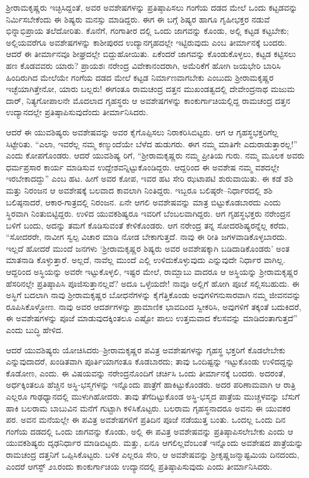 ಶ್ರೀರಾಮಕೃಷ್ಣರು ಇಚ್ಛಿಸಿದ್ದಂತೆ, ಅವರ ಅವಶೇಷಗಳನ್ನು ಪ್ರತಿಷ್ಠಾಪಿಸಲು ಗಂಗೆಯ ದಡದ ಮೇಲೆ ಒಂದು ಕಟ್ಟಡವನ್ನು ನಿರ್ಮಿಸಬೇಕೆಂದು ಈ ಶಿಷ್ಯರು ಮನಸ್ಸು ಮಾಡಿದ್ದರು. ಈಗ ಈ ಬಗ್ಗೆ ಶಿಷ್ಯರ ಹಾಗೂ ಗೃಹೀಭಕ್ತರ ನಡುವೆ ಭಿನ್ನಾಭಿಪ್ರಾಯ ತಲೆದೋರಿತು. ಕೊನೆಗೆ, ಗಂಗಾತೀರ ದಲ್ಲಿ ಒಂದು ಜಾಗವನ್ನು ಕೊಂಡು, ಅಲ್ಲಿ ಕಟ್ಟಡ ಕಟ್ಟಬೇಕು; ಅಲ್ಲಿಯವರೆಗೂ ಅವಶೇಷಗಳನ್ನು ಕಾಶೀಪುರದ ಉದ್ಯಾನಗೃಹದಲ್ಲೇ ಇಟ್ಟಿರುವುದು ಎಂಬ ತೀರ್ಮಾನಕ್ಕೆ ಬಂದರು. ಆದರೆ ಈ ತೀರ್ಮಾನವೂ ಶೀಘ್ರದಲ್ಲೇ ಬಿದ್ದುಹೋಯಿತು. ಏಕೆಂದರೆ ಜಾಗವನ್ನು ಕೊಂಡುಕೊಳ್ಳಲು, ಕಟ್ಟಡ ಕಟ್ಟಿಸಲು ಹಣ ಕೊಡವವರು ಯಾರು? ಪ್ರಾಯಶಃ ನರೇಂದ್ರ ವಿವೇಕಾನಂದರಾಗಿ, ಅಮೆರಿಕೆಗೆ ಹೋಗಿ ಜಯಭೇರಿ ಬಾರಿಸಿ ಹಿಂದಿರುಗಿದ ಮೇಲೆಯೇ ಗಂಗೆಯ ದಡದ ಮೇಲೆ ಕಟ್ಟಡ ನಿರ್ಮಾಣವಾಗಬೇಕು ಎಂಬುದು ಶ್ರೀರಾಮಕೃಷ್ಣರ ಇಚ್ಛೆಯಾಗಿತ್ತೇನೋ, ಯಾರು ಬಲ್ಲರು! ಈಗಂತೂ ರಾಮಚಂದ್ರ ದತ್ತನ ಮುಖಂಡತ್ವದಲ್ಲಿ ದೇವೇಂದ್ರನಾಥ ಮಜುಮ ದಾರ್, ನಿತ್ಯಗೋಪಾಲನೇ ಮೊದಲಾದ ಗೃಹಸ್ಥರು ಆ ಅವಶೇಷಗಳನ್ನು ಕಾಂಕುರ್ಗಾಚಿಯಲ್ಲಿದ್ದ ರಾಮಚಂದ್ರ ದತ್ತನ ಉದ್ಯಾನದಲ್ಲೇ ಪ್ರತಿಷ್ಠಾಪಿಸುವುದೆಂದು ತೀರ್ಮಾನಿಸಿದರು.

ಆದರೆ ಈ ಯುವಶಿಷ್ಯರು ಅವಶೇಷವನ್ನು ಅವರ ಕೈಗೊಪ್ಪಿಸಲು ನಿರಾಕರಿಸಿಬಿಟ್ಟರು. ಆಗ ಆ ಗೃಹಸ್ಥಭಕ್ತರಿಗೆಲ್ಲ ಸಿಟ್ಟೇರಿತು. “ಎಲಾ, ಇವರೆಲ್ಲ ನಮ್ಮ ಕಣ್ಮುಂದೆಯೇ ಬೆಳೆದ ಹುಡುಗರು. ಈಗ ನಮ್ಮ ಮಾತಿಗೇ ಎದುರಾಡುತ್ತಾರಲ್ಲ!” ಎಂದು ಕೋಪಗೊಂಡರು. ಆದರೆ ಯುವಶಿಷ್ಯ ರಿಗೆ, “ಶ್ರೀರಾಮಕೃಷ್ಣರು ನಮ್ಮ ಪ್ರೀತಿಯ ಗುರು. ನಮ್ಮ ಮೂಲಕ ಅವರು ಧರ್ಮಪ್ರಸಾರ ಕಾರ್ಯ ಮಾಡಿಸುವ ಉದ್ದೇಶವನ್ನಿಟ್ಟುಕೊಂಡಿದ್ದರು. ಆದ್ದರಿಂದ ಈ ಅವಶೇಷ ನಮ್ಮ ವಶದಲ್ಲೇ ಇರಬೇಕಾದದ್ದು” ಎಂಬ ಹಟ. ಹೀಗೆ ಅವರ ಕೋಪ, ಇವರ ಹಟ ಸೇರಿ ಝಟಾಪಟಿ ಶುರುವಾಯಿತು. ಈ ಕಡೆ ಶಶಿ ಮತ್ತು ನಿರಂಜನ ಆ ಅವಶೇಷಕ್ಕೆ ಬಲವಾದ ಕಾವಲಾಗಿ ನಿಂತಿದ್ದರು. ಇಬ್ಬರೂ ಬಲಿಷ್ಠರೇ–ನಿರ್ಧಾರದಲ್ಲಿ ಶಶಿ ಬಲಿಷ್ಠನಾದರೆ, ಆಕಾರ-ಗಾತ್ರದಲ್ಲಿ ನಿರಂಜನ. ಏನೇ ಆಗಲಿ ಅವಶೇಷವನ್ನು ಮಾತ್ರ ಬಿಟ್ಟುಕೊಡಬಾರದು ಎಂದು ಸ್ಥಿರವಾಗಿ ನಿಂತುಬಿಟ್ಟಿದ್ದರು. ಉಳಿದ ಯುವಕಶಿಷ್ಯರೂ ಇವರಿಗೆ ಬೆಂಬಲವಾಗಿದ್ದರು. ಆಗ ಗೃಹಸ್ಥಭಕ್ತರು ನರೇಂದ್ರನ ಬಳಿಗೆ ಬಂದು, ಅದನ್ನು ತಮಗೆ ಕೊಡಿಸುವಂತೆ ಕೇಳಿಕೊಂಡರು. ಆಗ ನರೇಂದ್ರ ತನ್ನ ಸೋದರಶಿಷ್ಯರನ್ನೆಲ್ಲ ಕರೆದು, “ಸೋದರರೇ, ನಾವೀಗ ಸ್ವಲ್ಪ ವಿಚಾರ ಮಾಡಿ ನೋಡ ಬೇಕಾಗುತ್ತದೆ. ನಾವು ಈ ರೀತಿ ಜಗಳವಾಡಿಕೊಳ್ಳಬಾರದು. ಇಲ್ಲದೆ ಹೋದರೆ ಮುಂದೆ ಜನಗಳು ‘ಶ್ರೀರಾಮಕೃಷ್ಣರ ಶಿಷ್ಯರು ಅವರ ಅವಶೇಷಕ್ಕಾಗಿ ಬಡಿದಾಡಿಕೊಂಡರು’ ಅಂತ ಮಾತನಾಡಿ ಕೊಳ್ಳುತ್ತಾರೆ. ಅಲ್ಲದೆ, ನಾವೆಲ್ಲ ಮುಂದೆ ಎಲ್ಲಿ ಉಳಿದುಕೊಳ್ಳುವುದು ಎನ್ನುವುದೇ ನಿರ್ಧಾರ ವಾಗಿಲ್ಲ. ಆದ್ದರಿಂದ ಅಸ್ಥಿಯನ್ನು ಅವರೇ ಇಟ್ಟುಕೊಳ್ಳಲಿ, ಇಷ್ಟರ ಮೇಲೆ, ರಾಮ್ಬಾಬು ವಾದರೂ ಆ ಅಸ್ಥಿಯನ್ನು ಶ್ರೀರಾಮಕೃಷ್ಣರ ಹೆಸರಿನಲ್ಲೇ ಪ್ರತಿಷ್ಠಾಪಿಸಿ ಪೂಜಿಸುತ್ತಾನಲ್ಲವೆ? ಅದೂ ಒಳ್ಳೆಯದೇ! ನಾವೂ ಅಲ್ಲಿಗೆ ಹೋಗಿ ಪೂಜೆ ಸಲ್ಲಿಸಬಹುದು. ಈ ಅಸ್ಥಿಗೆ ಬದಲಾಗಿ ನಾವು ಶ್ರೀರಾಮಕೃಷ್ಣರ ಬೋಧನೆಗಳನ್ನು ಕೈಗೆತ್ತಿಕೊಂಡು ಅವುಗಳಿಗನುಸಾರವಾಗಿ ನಮ್ಮ ಜೀವನವನ್ನು ರೂಪಿಸಿಕೊಳ್ಳೋಣ. ನಾವು ಅವರ ಆದರ್ಶಗಳನ್ನು ಪ್ರಾಮಾಣಿಕ ಭಾವದಿಂದ ಸ್ವೀಕರಿಸಿ, ಅವುಗಳಿಗೆ ತಕ್ಕಂತೆ ಬದುಕಿದರೆ, ಈ ಅವಶೇಷಗಳನ್ನು ಪೂಜೆ ಮಾಡುವುದಕ್ಕಿಂತಲೂ ಎಷ್ಟೋ ಪಾಲು ಉತ್ತಮವಾದ ಕೆಲಸವನ್ನು ಮಾಡಿದಂತಾಗುತ್ತದೆ” ಎಂದು ಬುದ್ಧಿ ಹೇಳಿದ.

ಆದರೆ ಯುವಶಿಷ್ಯರು ಯೋಚಿಸಿದರು–ಶ್ರೀರಾಮಕೃಷ್ಣರ ಪವಿತ್ರ ಅವಶೇಷಗಳನ್ನು ಗೃಹಸ್ಥ ಭಕ್ತರಿಗೆ ಕೊಡಲೇಬೇಕು ಎನ್ನುವುದಾದರೆ, ಖಂಡಿತವಾಗಿ ಪೂರ್ತಿಯಾಗಂತೂ ಕೊಡಬಾರದು; ತಾವು ಒಂದಿಷ್ಟನ್ನು ಇಟ್ಟುಕೊಂಡು ಉಳಿದದ್ದನ್ನು ಕೊಡೋಣ, ಎಂದು. ಈ ವಿಷಯವನ್ನು ನರೇಂದ್ರನೊಂದಿಗೆ ಚರ್ಚಿಸಿ ಒಂದು ತೀರ್ಮಾನಕ್ಕೆ ಬಂದರು. ಅದರಂತೆ, ಅರ್ಧಕ್ಕಿಂತಲೂ ಹೆಚ್ಚಿನ ಅಸ್ಥಿ-ಭಸ್ಮಗಳನ್ನು ಇನ್ನೊಂದು ಪಾತ್ರೆಗೆ ಹಾಕಿಟ್ಟುಕೊಂಡರು. ಅದರ ಪರಿಣಾಮವಾಗಿ ಆ ರಾತ್ರಿ ಎಲ್ಲರೂ ಗಾಢಧ್ಯಾನದಲ್ಲಿ ಮುಳುಗಿಹೋದರು. ತಾವು ತೆಗೆದಿಟ್ಟುಕೊಂಡ ಅಸ್ಥಿ-ಭಸ್ಮದ ಪಾತ್ರೆಯ ಮುಚ್ಚಳವನ್ನು ಬೆಸುಗೆ ಹಾಕಿ ಬಲರಾಮ ಬಾಬುವಿನ ಮನೆಗೆ ಗುಟ್ಟಾಗಿ ಕಳಿಸಿಕೊಟ್ಟರು. ಬಲರಾಮ ಗೃಹಸ್ಥನಾದರೂ ಅವನು ಈ ಯುವಕರ ಪರ. ಅವನ ಮನೆಯಲ್ಲೇ ಈ ಪವಿತ್ರ ಅವಶೇಷಗಳಿಗೆ ಪ್ರತಿದಿನ ಪೂಜೆ ನಡೆಯುತ್ತ ಬಂತು. ಒಂದಲ್ಲ ಒಂದು ದಿನ ಗಂಗೆಯ ದಡದಲ್ಲಿ ಒಂದು ಜಾಗವನ್ನು ಕೊಂಡು, ಅಲ್ಲಿ ಈ ಪವಿತ್ರ ಅವಶೇಷವನ್ನು ಪ್ರತಿಷ್ಠಾಪಿಸಲೇಬೇಕು ಎಂದು ಆ ಯುವಕಶಿಷ್ಯರು ದೃಢನಿರ್ಧಾರ ಮಾಡಿಬಿಟ್ಟರು. ಮತ್ತು, ಏನೂ ಆಗಲಿಲ್ಲವೆಂಬಂತೆ ಇನ್ನೊಂದು ಅವಶೇಷದ ಪಾತ್ರೆಯನ್ನು ರಾಮಚಂದ್ರ ದತ್ತನಿಗೆ ಒಪ್ಪಿಸಿಕೊಟ್ಟರು. ಬಳಿಕ ಎಲ್ಲರೂ ಸೇರಿ, ಆ ಅವಶೇಷವನ್ನು ಶ್ರೀಕೃಷ್ಣಜನ್ಮಾಷ್ಟಮಿಯ ದಿನದಂದು, ಎಂದರೆ ಆಗಸ್ಟ್ ೨೩ರಂದು ಕಾಂಕುರ್ಗಾಚಿಯ ಉದ್ಯಾನದಲ್ಲಿ ಪ್ರತಿಷ್ಠಾಪಿಸುವುದು ಎಂದು ತೀರ್ಮಾನಿಸಿದರು.

